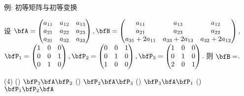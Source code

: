 \begin{frame}{例: 初等矩阵与初等变换}
	\onslide<+->
	\begin{example}
		设 $\bfA=\begin{pmatrix}
			a_{11}&a_{12}&a_{13}\\
			a_{21}&a_{22}&a_{23}\\
			a_{31}&a_{32}&a_{33}
		\end{pmatrix},\bfB=\begin{pmatrix}
			a_{11}&a_{13}&a_{12}\\
			a_{21}&a_{23}&a_{22}\\
			a_{31}+2a_{11}&a_{33}+2a_{13}&a_{32}+2a_{12}
		\end{pmatrix}$,\\
		$\bfP_1=\begin{pmatrix}
			1&0&0\\0&0&1\\0&1&0
		\end{pmatrix},\bfP_2=\begin{pmatrix}
			0&0&1\\0&1&0\\1&0&0
		\end{pmatrix},\bfP_3=\begin{pmatrix}
			1&0&0\\0&1&0\\2&0&1
		\end{pmatrix}$.
		则 $\bfB=$.
		\begin{taskschoice}(4)
			() $\bfP_3\bfA\bfP_2$
			() $\bfP_2\bfA\bfP_3$
			() $\bfP_3\bfA\bfP_1$
			() $\bfP_1\bfP_2\bfA$
		\end{taskschoice}
	\end{example}
\end{frame}


